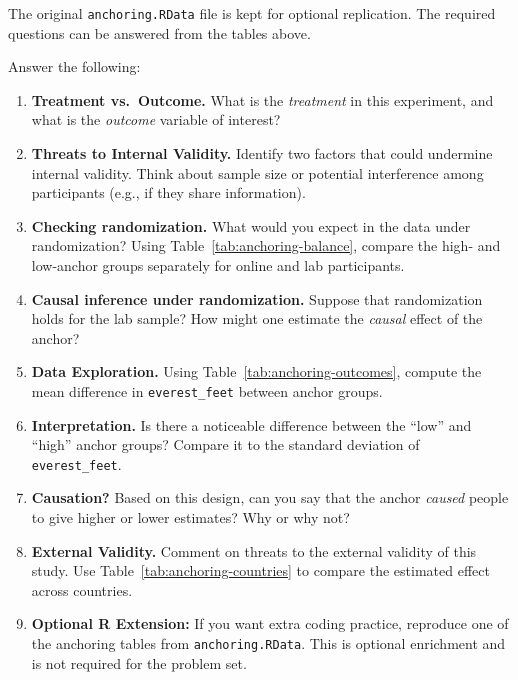 \documentclass[12pt]{article}
\begin{document}
The original \texttt{anchoring.RData} file is kept for optional replication. The required questions can be answered from the tables above.

Answer the following:

\begin{enumerate}
  \item \textbf{Treatment vs.\ Outcome.} What is the \emph{treatment} in this experiment, and what is the \emph{outcome} variable of interest?
  \item \textbf{Threats to Internal Validity.} Identify two factors that could undermine internal validity. Think about sample size or potential interference among participants (e.g., if they share information).
  \item \textbf{Checking randomization.} What would you expect in the data under randomization? Using Table~\ref{tab:anchoring-balance}, compare the high- and low-anchor groups separately for online and lab participants.
  \item \textbf{Causal inference under randomization.} Suppose that randomization holds for the lab sample? How might one estimate the \emph{causal} effect of the anchor?
  \item \textbf{Data Exploration.} Using Table~\ref{tab:anchoring-outcomes}, compute the mean difference in \texttt{everest\_feet} between anchor groups.
  \item \textbf{Interpretation.} Is there a noticeable difference between the “low” and “high” anchor groups? Compare it to the standard deviation of \texttt{everest\_feet}.
  \item \textbf{Causation?} Based on this design, can you say that the anchor \emph{caused} people to give higher or lower estimates? Why or why not?
  \item \textbf{External Validity.} Comment on threats to the external validity of this study. Use Table~\ref{tab:anchoring-countries} to compare the estimated effect across countries.
  \item \textbf{Optional R Extension:} If you want extra coding practice, reproduce one of the anchoring tables from \texttt{anchoring.RData}. This is optional enrichment and is not required for the problem set.
\end{enumerate}
\end{document}
